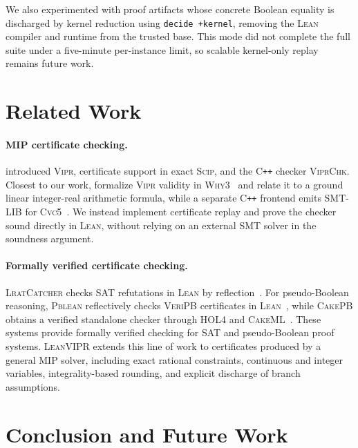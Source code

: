 \documentclass{article}
\newcommand{\code}[1]{\textcolor{blue!70!black}{\texttt{#1}}}
\newcommand{\tool}{\textsc{LeanVIPR}}
\newcommand{\scip}{\textsc{Scip}}
\newcommand{\vipr}{\textsc{Vipr}}
\newcommand{\lean}{\textsc{Lean}}
\begin{document}
We also experimented with proof artifacts whose concrete Boolean equality is
discharged by kernel reduction using \code{decide +kernel}, removing the
\lean{} compiler and runtime from the trusted base. This mode did not complete
the full suite under a five-minute per-instance limit, so scalable kernel-only
replay remains future work.

\section{Related Work}\label{sec:related}
\paragraph{MIP certificate checking.}

\citet{cheung2017verifying} introduced \vipr{}, certificate support in exact \scip{}, and the C\texttt{++} checker \textsc{ViprChk}.
Closest to our work, \citet{wood2025satisfiability} formalize \vipr{} validity in \textsc{Why3}~\citep{filliatre2013why3} and relate it to a ground linear integer-real arithmetic formula, while a separate C\texttt{++} frontend emits SMT-LIB for \textsc{Cvc5}~\citep{barrett2010smt,barbosa2022cvc5}.
We instead implement certificate replay and prove the checker sound directly in
\lean{}, without relying on an external SMT solver in the soundness argument.

\paragraph{Formally verified certificate checking.}
\textsc{LratCatcher} checks SAT refutations in \lean{} by reflection~\citep{szeider2026lrat}.
For pseudo-Boolean reasoning, \textsc{Pblean} reflectively checks \textsc{VeriPB} certificates in \lean{}~\citep{szeider2026pblean}, while \textsc{CakePB} obtains a verified standalone checker through \textsc{HOL4} and \textsc{CakeML}~\citep{gocht2024end}.
These systems provide formally verified checking for SAT and pseudo-Boolean
proof systems. \tool{} extends this line of work to certificates produced by a
general MIP solver, including exact rational constraints, continuous and
integer variables, integrality-based rounding, and explicit discharge of branch
assumptions.

\section{Conclusion and Future Work}\label{sec:conclusion}
\end{document}
